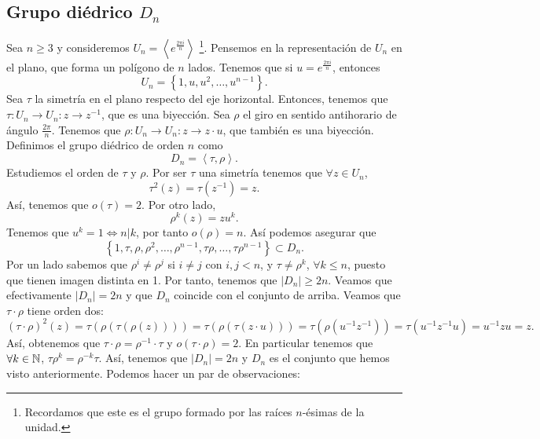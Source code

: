 \subsection{Grupo diédrico $\displaystyle D_{n} $}
Sea $\displaystyle n \geq 3 $ y consideremos $\displaystyle U_{n} = \left\langle e^{\frac{2\pi i }{n}} \right\rangle $ \footnote{Recordamos que este es el grupo formado por las raíces $\displaystyle n $-ésimas de la unidad.}. Pensemos en la representación de $\displaystyle U_{n} $ en el plano, que forma un polígono de $\displaystyle n $ lados. Tenemos que si $\displaystyle u = e^{\frac{2\pi i }{n}} $, entonces
\[U_{n} = \left\{ 1, u, u^{2}, \ldots, u^{n-1}\right\}  .\]
Sea $\displaystyle \tau $ la simetría en el plano respecto del eje horizontal. Entonces, tenemos que $\displaystyle \tau : U_{n} \to U_{n} : z \to z^{-1} $, que es una biyección. Sea $\displaystyle \rho $ el giro en sentido antihorario de ángulo $\displaystyle \frac{2\pi }{n} $. Tenemos que $\displaystyle \rho : U_{n} \to U_{n} : z \to z \cdot u $, que también es una biyección. Definimos el grupo diédrico de orden $\displaystyle n $ como 
\[D_{n} = \left\langle \tau , \rho \right\rangle  .\]
Estudiemos el orden de $\displaystyle \tau  $ y $\displaystyle \rho $. Por ser $\displaystyle \tau $ una simetría tenemos que $\displaystyle \forall z \in U_{n} $,
\[\tau ^{2}\left(z\right) = \tau\left(z^{-1}\right) = z .\]
Así, tenemos que $\displaystyle o\left(\tau \right) = 2 $. Por otro lado, 
\[\rho ^{k}\left(z\right) = z u^{k} .\]
Tenemos que $\displaystyle u^{k} = 1 \iff n|k$, por tanto $\displaystyle o\left(\rho \right) = n $. Así podemos asegurar que  
\[ \left\{ 1, \tau, \rho, \rho^{2}, \ldots, \rho ^{n -1}, \tau \rho, \ldots, \tau \rho^{n-1}\right\} \subset D_{n}.\]
Por un lado sabemos que $\displaystyle \rho^{i} \neq \rho^{j} $ si $\displaystyle i \neq j $ con $\displaystyle i,j < n $, y $\displaystyle \tau \neq \rho^{k} $, $\displaystyle \forall k \leq n $, puesto que tienen imagen distinta en 1. Por tanto, tenemos que $\displaystyle \left|D_{n}\right| \geq 2n $. Veamos que efectivamente $\displaystyle \left|D_{n}\right| = 2n $ y que $\displaystyle D_{n} $ coincide con el conjunto de arriba. Veamos que $\displaystyle \tau \cdot \rho $ tiene orden dos:
\[\left(\tau \cdot \rho\right)^{2} \left(z\right) = \tau\left(\rho\left(\tau\left(\rho\left(z\right)\right)\right)\right) = \tau\left(\rho\left(\tau\left(z \cdot u\right)\right)\right) = \tau\left(\rho\left(u^{-1}z^{-1}\right)\right) = \tau\left(u^{-1}z^{-1}u\right) = u^{-1}zu = z .\]
Así, obtenemos que $\displaystyle \tau \cdot \rho = \rho^{-1} \cdot \tau $ y $\displaystyle o\left(\tau \cdot \rho\right) = 2 $. En particular tenemos que $\displaystyle \forall k \in \mathbb{N} $, $\displaystyle \tau\rho^{k} = \rho^{-k}\tau $. Así, tenemos que $\displaystyle \left|D_{n}\right| = 2n $ y $\displaystyle D_{n} $ es el conjunto que hemos visto anteriormente. Podemos hacer un par de observaciones:
